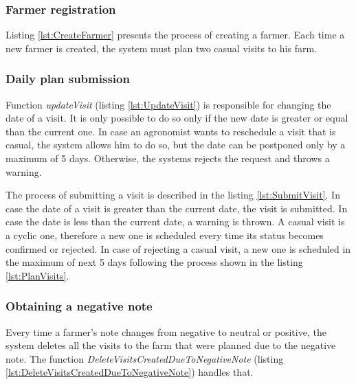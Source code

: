 \subsubsection*{Farmer registration}

Listing \ref{lst:CreateFarmer} presents the process of creating a farmer. Each time a new farmer is created, the system must plan two casual visits to his farm.



\subsubsection*{Daily plan submission}

Function \textit{updateVisit} (listing \ref{lst:UpdateVisit}) is responsible for changing the date of a visit. It is only possible to do so only if the new date is greater or equal than the current one. In case an agronomist wants to reschedule a visit that is casual, the system allows him to do so, but the date can be postponed only by a maximum of 5 days. Otherwise, the systems rejects the request and throws a warning.



The process of submitting a visit is described in the listing \ref{lst:SubmitVisit}. In case the date of a visit is greater than the current date, the visit is submitted. In case the date is less than the current date, a warning is thrown. A casual visit is a cyclic one, therefore a new one is scheduled every time its status becomes confirmed or rejected. In case of rejecting a casual visit, a new one is scheduled in the maximum of next 5 days following the process shown in the listing \ref{lst:PlanVisits}.



\subsubsection*{Obtaining a negative note}

Every time a farmer's note changes from negative to neutral or positive, the system deletes all the visits to the farm that were planned due to the negative note. The function \textit{DeleteVisitsCreatedDueToNegativeNote} (listing \ref{lst:DeleteVisitsCreatedDueToNegativeNote}) handles that.

